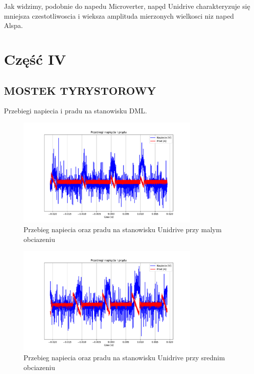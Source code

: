\documentclass[11pt]{article}
\begin{document}
Jak widzimy, podobnie do napedu Microverter, napęd Unidrive charakteryzuje się mniejsza czestotliwoscia i wieksza amplituda mierzonych wielkosci niz naped Alspa.\\

\section{Część IV}

\subsection{MOSTEK TYRYSTOROWY}

Przebiegi napiecia i pradu na stanowisku DML.\\

\begin{figure}[H]
\centering
\includegraphics[width=0.8\textwidth]{aun1_dml_obciazenie_weak.pdf}
\caption{Przebieg napiecia oraz pradu na stanowisku Unidrive przy malym obciazeniu}
\end{figure}

\begin{figure}[H]
\centering
\includegraphics[width=0.8\textwidth]{aun1_dml_obciazenie_medium.pdf}
\caption{Przebieg napiecia oraz pradu na stanowisku Unidrive przy srednim obciazeniu}
\end{figure}
\end{document}
